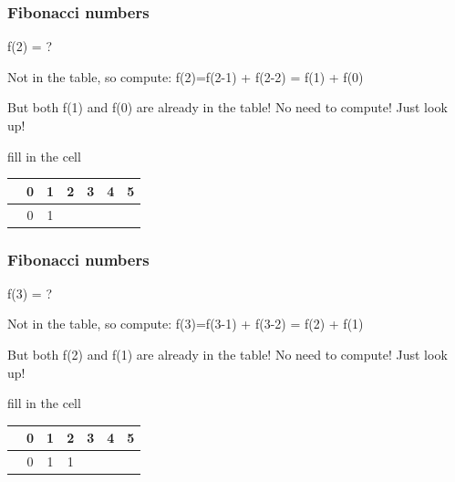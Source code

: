 \documentclass{beamer}
\begin{document}
\begin{frame}
\frametitle{Fibonacci numbers}
f(2) = ?

\vspace{0.5cm}

Not in the table, so compute: f(2)=f(2-1) + f(2-2) = f(1) + f(0) 

\vspace{0.5cm}

But both f(1) and f(0) are already in the table! No need to compute! Just look up!

\vspace{0.5cm}

fill in the cell

\vspace{0.5cm}

\begin{tabular}{c|cccccc}
&0&1&2&3&4&5\\
\hline
&0&1&&&&\\
\end{tabular}
\end{frame}

\begin{frame}
\frametitle{Fibonacci numbers}
f(3) = ?

\vspace{0.5cm}

Not in the table, so compute: f(3)=f(3-1) + f(3-2) = f(2) + f(1) 

\vspace{0.5cm}

But both f(2) and f(1) are already in the table! No need to compute! Just look up!

\vspace{0.5cm}

fill in the cell

\vspace{0.5cm}

\begin{tabular}{c|cccccc}
&0&1&2&3&4&5\\
\hline
&0&1&1&&&\\
\end{tabular}
\end{frame}
\end{document}
